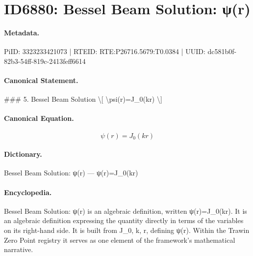 \section*{ID6880: Bessel Beam Solution: ψ(r)}
\paragraph{Metadata.}
PiID: 3323233421073 | RTEID: RTE:P26716.5679:T0.0384 | UUID: dc581b0f-82b3-54ff-819c-2413feff6614

\paragraph{Canonical Statement.}
\#\#\# 5. Bessel Beam Solution \textbackslash{}[ \textbackslash{}psi(r)=J\_0(kr) \textbackslash{}]

\paragraph{Canonical Equation.}
\[
\psi(r)=J_0(kr)
\]

\paragraph{Dictionary.}
Bessel Beam Solution: ψ(r) — ψ(r)=J\_0(kr)

\paragraph{Encyclopedia.}
Bessel Beam Solution: ψ(r) is an algebraic definition, written ψ(r)=J\_0(kr). It is an algebraic definition expressing the quantity directly in terms of the variables on its right-hand side. It is built from J\_0, k, r, defining ψ(r). Within the Trawin Zero Point registry it serves as one element of the framework's mathematical narrative.
